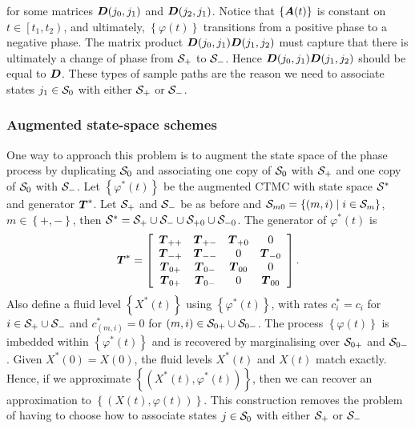 for some matrices \(\boldsymbol{D}({j_0},{j_1})\) and \(\boldsymbol{D}({j_2},{j_1})\). Notice that \(\left\{\boldsymbol A(t)\right\}\) is constant on \(t\in\left[t_1,t_2\right)\), and ultimately, \(\left\{\varphi(t)\right\}\) transitions from a positive phase to a negative phase. The matrix product \(\boldsymbol{D}({j_0},{j_1})\boldsymbol{D}({j_1},{j_2})\) must capture that there is ultimately a change of phase from \(\mathcal{S}_+\) to \(\mathcal{S}_-\). Hence \(\boldsymbol{D}({j_0},{j_1})\boldsymbol{D}({j_1},{j_2})\) should be equal to \(\boldsymbol{D}\). These types of sample paths are the reason we need to associate states \({j_1}\in\mathcal{S}_0\) with either \(\mathcal{S}_+\) or \(\mathcal{S}_-\).

\subsubsection{Augmented state-space schemes}\label{subsec: augmented }
One way to approach this problem is to augment the state space of the phase process by duplicating \(\mathcal{S}_0\) and associating one copy of \(\mathcal{S}_0\) with \(\mathcal{S}_+\) and one copy of \(\mathcal{S}_0\) with \(\mathcal{S}_-\). Let \(\left\{\varphi^*(t)\right\}\) be the augmented CTMC with state space \(\mathcal{S}^*\) and generator \(\boldsymbol{T}^*\). Let \(\mathcal{S}_+\) and \(\mathcal{S}_-\) be as before and \(\mathcal{S}_{m0} = \left\{(m,i)\mid i\in\mathcal{S}_m\right\}\), \(m\in\left\{+,-\right\}\), then \(\mathcal{S}^* = \mathcal{S}_+\cup\mathcal{S}_-\cup\mathcal{S}_{+0}\cup\mathcal{S}_{-0}\). 
The generator of \(\varphi^*(t)\) is
\[\boldsymbol{T}^* = \left[\begin{array}{cccc} \boldsymbol{T}_{++} & \boldsymbol{T}_{+-} & \boldsymbol{T}_{+0} & 0 \\ \boldsymbol{T}_{-+} & \boldsymbol{T}_{--} & 0 & \boldsymbol{T}_{-0} \\ \boldsymbol{T}_{0+} & \boldsymbol{T}_{0-} & \boldsymbol{T}_{00} & 0 \\  \boldsymbol{T}_{0+} & \boldsymbol{T}_{0-} & 0 & \boldsymbol{T}_{00} \end{array}\right]. \]
Also define a fluid level \(\left\{X^*(t)\right\}\) using \(\left\{\varphi^*(t)\right\}\), with rates \(c_i^*=c_i\) for \(i\in\mathcal{S}_+\cup\mathcal{S}_-\) and \(c_{(m,i)}^* = 0\) for \((m,i)\in\mathcal{S}_{0+}\cup\mathcal{S}_{0-}\). The process \(\left\{\varphi(t)\right\}\) is imbedded within \(\left\{\varphi^*(t)\right\}\) and is recovered by marginalising over \(\mathcal{S}_{0+}\) and \(\mathcal{S}_{0-}\). Given \(X^*(0)=X(0)\), the fluid levels \(X^*(t)\) and \(X(t)\) match exactly. Hence, if we approximate \(\left\{(X^*(t),\varphi^*(t))\right\}\), then we can recover an approximation to \(\left\{(X(t),\varphi(t))\right\}\). This construction removes the problem of having to choose how to associate states \(j\in\mathcal{S}_0\) with either \(\mathcal{S}_+\) or \(\mathcal{S}_-\)

